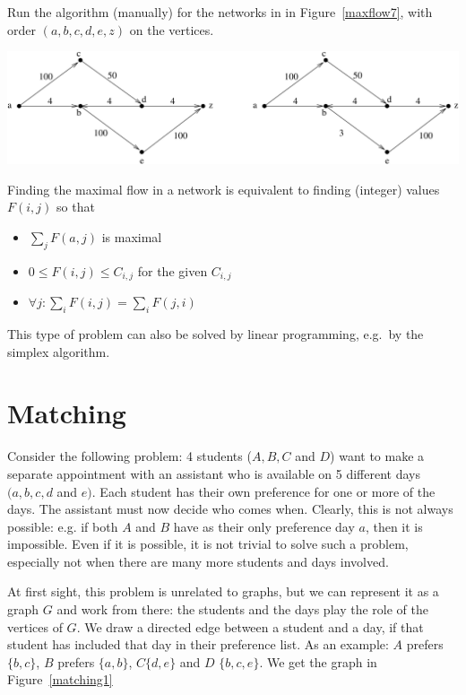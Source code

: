 \begin{example}
Run the algorithm (manually) for the networks in in
Figure~\ref{maxflow7}, with order $(a,b,c,d,e,z)$ on the vertices.
	\begin{center}
		\includegraphics[width=0.8\linewidth,keepaspectratio]{maxflow7} %
	\end{center}
\end{example}

\pagebreak

Finding the maximal flow in a network is equivalent to finding
(integer) values $F(i,j)$ so that
\begin{itemize}
\item
$\sum_{j} F(a,j)$ is maximal
\item
$0 \leq F(i,j) \leq C_{i,j}$ for the given $C_{i,j}$
\item
$\forall j: \sum_{i} F(i,j) = \sum_{i} F(j,i)$
\end{itemize}

This type of problem can also be solved by linear programming,
e.g.\ by the simplex algorithm.

\section{Matching}

Consider the following problem: 4 students ($A,B,C$ and $D$) want to
make a separate appointment with an assistant who is available on 5
different days $(a,b,c,d$ and $e)$. Each student has their own
preference for one or more of the days. The assistant must now decide
who comes when.  Clearly, this is not always possible: e.g. if both
$A$ and $B$ have as their only preference day $a$, then it is
impossible. Even if it is possible, it is not trivial to solve such a
problem, especially not when there are many more students and days
involved.

At first sight, this problem is unrelated to graphs, but we can
represent it as a graph $G$ and work from there: the students and the
days play the role of the vertices of $G$. We draw a directed edge
between a student and a day, if that student has included that day in
their preference list. As an example: $A$ prefers $\{b,c\}$, $B$
prefers $\{a,b\}$, $C \{d,e\}$ and $D$ $\{b,c,e\}$. We get the graph
in Figure~\ref{matching1}

